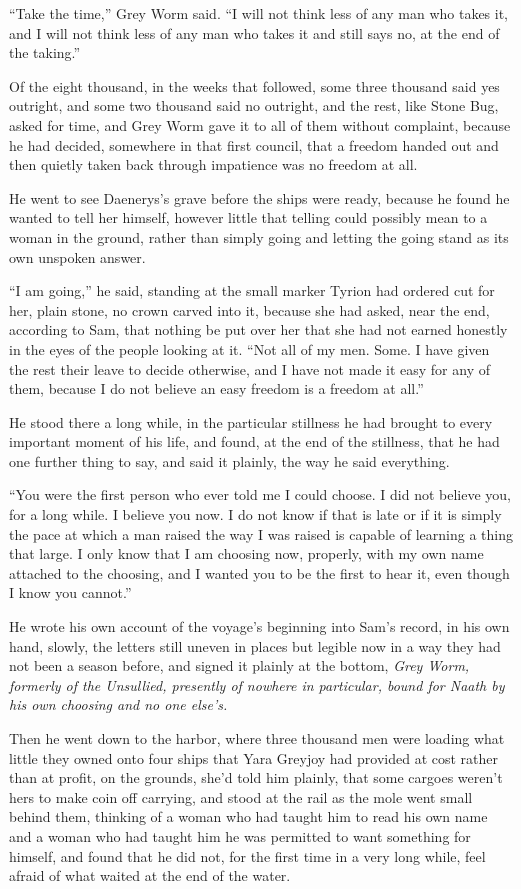 “Take the time,” Grey Worm said. “I will not think less of any man who takes it, and I will not think less of any man who takes it and still says no, at the end of the taking.”

Of the eight thousand, in the weeks that followed, some three thousand said yes outright, and some two thousand said no outright, and the rest, like Stone Bug, asked for time, and Grey Worm gave it to all of them without complaint, because he had decided, somewhere in that first council, that a freedom handed out and then quietly taken back through impatience was no freedom at all.

\sceneBreak

He went to see Daenerys’s grave before the ships were ready, because he found he wanted to tell her himself, however little that telling could possibly mean to a woman in the ground, rather than simply going and letting the going stand as its own unspoken answer.

“I am going,” he said, standing at the small marker Tyrion had ordered cut for her, plain stone, no crown carved into it, because she had asked, near the end, according to Sam, that nothing be put over her that she had not earned honestly in the eyes of the people looking at it. “Not all of my men. Some. I have given the rest their leave to decide otherwise, and I have not made it easy for any of them, because I do not believe an easy freedom is a freedom at all.”

He stood there a long while, in the particular stillness he had brought to every important moment of his life, and found, at the end of the stillness, that he had one further thing to say, and said it plainly, the way he said everything.

“You were the first person who ever told me I could choose. I did not believe you, for a long while. I believe you now. I do not know if that is late or if it is simply the pace at which a man raised the way I was raised is capable of learning a thing that large. I only know that I am choosing now, properly, with my own name attached to the choosing, and I wanted you to be the first to hear it, even though I know you cannot.”

\sceneBreak

He wrote his own account of the voyage’s beginning into Sam’s record, in his own hand, slowly, the letters still uneven in places but legible now in a way they had not been a season before, and signed it plainly at the bottom, \textit{Grey Worm, formerly of the Unsullied, presently of nowhere in particular, bound for Naath by his own choosing and no one else’s.}

Then he went down to the harbor, where three thousand men were loading what little they owned onto four ships that Yara Greyjoy had provided at cost rather than at profit, on the grounds, she’d told him plainly, that some cargoes weren’t hers to make coin off carrying, and stood at the rail as the mole went small behind them, thinking of a woman who had taught him to read his own name and a woman who had taught him he was permitted to want something for himself, and found that he did not, for the first time in a very long while, feel afraid of what waited at the end of the water.